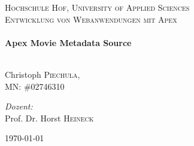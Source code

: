 \begin{titlepage}

\begin{center}

\textsc{\LARGE  Hochschule Hof, University of Applied Sciences}\\[1.5cm]
\textsc{\Large Entwicklung von Webanwendungen mit Apex}\\[0.5cm]

\HRule \\[0.4cm]
{\huge \bfseries Apex Movie Metadata Source}\\[0.4cm]

\HRule \\[1.5cm]

\begin{minipage}{0.4\textwidth}
\begin{flushleft} \large
Christoph \textsc{Piechula},\\
MN: \#02746310\\
\end{flushleft}
\end{minipage}
\begin{minipage}{0.4\textwidth}
\begin{flushright} \large
\emph{Dozent:} \\
Prof. Dr. Horst \textsc{Heineck}
\end{flushright}
\end{minipage}

\vfill

{\large \today}

\end{center}

\end{titlepage}
